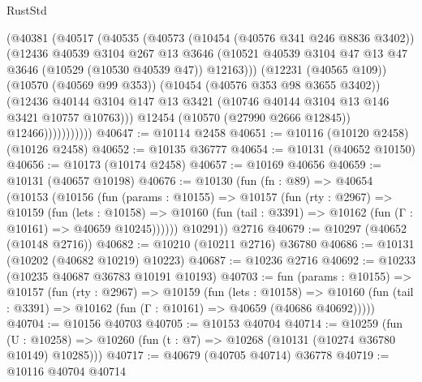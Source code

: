 \begin{lexlean}{RustStd}
\begin{coremodule}
                      (@40381
                        (@40517
                          (@40535
                            (@40573
                              (@10454 (@40576 @341 @246 @8836 @3402))
                              (@12436
                                @40539
                                @3104
                                @267
                                @13
                                @3646
                                (@10521
                                  @40539
                                  @3104
                                  @47
                                  @13
                                  @47
                                  @3646
                                  (@10529 (@10530 @40539 @47))
                                  @12163)))
                            (@12231 (@40565 @109))
                            (@10570 (@40569 @99 @353))
                            (@10454 (@40576 @353 @98 @3655 @3402))
                            (@12436
                              @40144
                              @3104
                              @147
                              @13
                              @3421
                              (@10746 @40144 @3104 @13 @146 @3421 @10757 @10763)))
                          @12454
                          (@10570 (@27990 @2666 @12845))
                          @12466)))))))))))
@40647 := @10114 @2458
@40651 := @10116 (@10120 @2458) (@10126 @2458)
@40652 := @10135 @36777
@40654 := @10131 (@40652 @10150)
@40656 := @10173 (@10174 @2458)
@40657 := @10169 @40656
@40659 := @10131 (@40657 @10198)
@40676 := @10130
    (fun (fn : @89) =>
    @40654
      (@10153
        (@10156
          (fun (params : @10155) =>
          @10157
            (fun (rty : @2967) =>
            @10159
              (fun (lets : @10158) =>
              @10160 (fun (tail : @3391) => @10162 (fun (Γ : @10161) => @40659 @10245))))))
        @10291))
    @2716
@40679 := @10297 (@40652 (@10148 @2716))
@40682 := @10210 (@10211 @2716) @36780
@40686 := @10131 (@10202 (@40682 @10219) @10223)
@40687 := @10236 @2716
@40692 := @10233 (@10235 @40687 @36783 @10191 @10193)
@40703 := fun (params : @10155) =>
  @10157
    (fun (rty : @2967) =>
    @10159
      (fun (lets : @10158) =>
      @10160 (fun (tail : @3391) => @10162 (fun (Γ : @10161) => @40659 (@40686 @40692)))))
@40704 := @10156 @40703
@40705 := @10153 @40704
@40714 := @10259
    (fun (U : @10258) => @10260 (fun (t : @7) => @10268 (@10131 (@10274 @36780 @10149) @10285)))
@40717 := @40679 (@40705 @40714) @36778
@40719 := @10116 @40704 @40714

\end{coremodule}
\end{lexlean}
